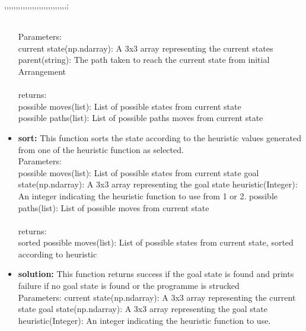 ,,,,,,,,,,,,,,,,,,,,,,,,,,,;\documentclass[conference]{IEEEtran}
\begin{document}
\begin{itemize}
\\
Parameters:
\\
current state(np.ndarray): A 3x3 array representing the current states
parent(string): The path taken to reach the current state
from initial Arrangement
\\
\\
returns:
\\
possible moves(list): List of possible states from current state
\\
possible paths(list): List of possible paths moves from current state
\\
       \item \textbf{sort:}
This function sorts the state according to the heuristic values generated from one of the heuristic function as selected.
\\
Parameters:
\\
possible moves(list): List of possible states from current state
goal state(np.ndarray): A 3x3  array representing the goal state
heuristic(Integer): An integer indicating the heuristic
function to use from 1 or 2.
possible paths(list): List of possible moves from current state
\\
\\
returns:
\\
sorted possible moves(list): List of possible states from current state, sorted according to heuristic
\\
      \item \textbf{solution:}
This function returns success if the goal state is found and prints failure if no goal state is found or the programme is strucked
\\
Parameters:
current state(np.ndarray): A 3x3 array representing the current state
goal state(np.ndarray): A 3x3 array representing the goal state
heuristic(Integer): An integer indicating the heuristic
function to use.
\\
\\
\end{itemize}
\end{document}
